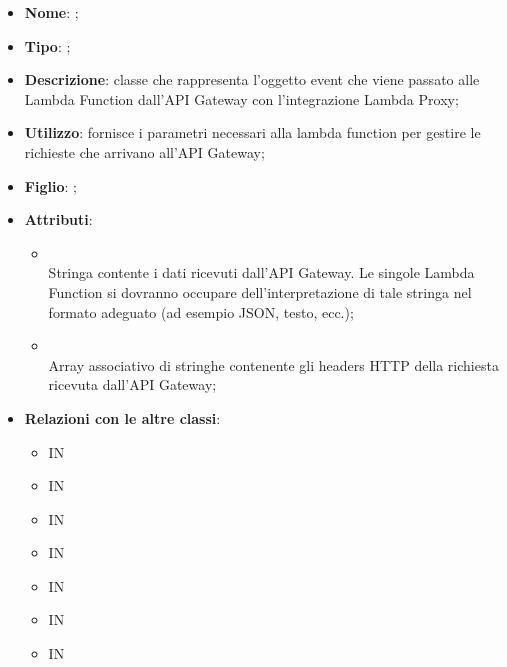 \begin{itemize}
	\item \textbf{Nome}: ;
	\item \textbf{Tipo}: ;
	\item \textbf{Descrizione}: classe che rappresenta l'oggetto event che viene passato alle Lambda Function dall'API Gateway con l'integrazione Lambda Proxy;
	\item \textbf{Utilizzo}: fornisce i parametri necessari alla lambda function per gestire le richieste che arrivano all'API Gateway;
	\item \textbf{Figlio}: ;
	\item \textbf{Attributi}:
	\begin{itemize}
		\item[]  \\
		Stringa contente i dati ricevuti dall'API Gateway. Le singole Lambda  Function si dovranno occupare dell'interpretazione di tale stringa nel formato adeguato (ad esempio JSON, testo, ecc.);
		\item[]  \\
		Array associativo di stringhe contenente gli headers HTTP della richiesta ricevuta dall'API Gateway;
	\end{itemize}
	\item \textbf{Relazioni con le altre classi}:
	\begin{itemize}
		\item IN \hyperlink{AdministrationWebhookService_label}{}
		\item IN \hyperlink{VocalAPI_label}{}
		\item IN \hyperlink{ConversationWebhookService_label}{}
		\item IN \hyperlink{NotificationService_label}{}
		\item IN \hyperlink{RulesService_label}{}
		\item IN \hyperlink{UsersService_label}{}
		\item IN \hyperlink{VAService_label}{}
	\end{itemize}
\end{itemize}
\FloatBarrier

